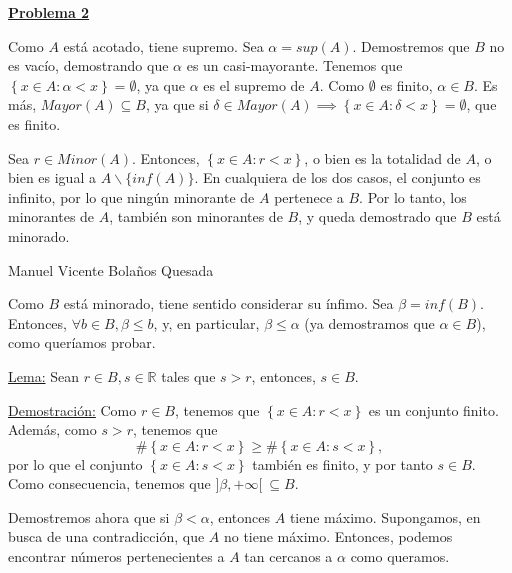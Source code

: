 \documentclass[10pt,a4paper]{article}
\begin{document}
	\begin{flushleft}
		\textbf{\underline{Problema 2}}
	\end{flushleft}
	
	Como $A$ está acotado, tiene supremo. Sea $\alpha = sup(A)$. Demostremos que $B$ no es vacío, demostrando que $\alpha$ es un casi-mayorante. Tenemos que $\left\lbrace x \in A : \alpha < x \right\rbrace  = \emptyset$, ya que $\alpha$ es el supremo de $A$. Como $\emptyset$ es finito, $\alpha \in B$. Es más, $Mayor(A) \subseteq B$, ya que si $\delta \in Mayor(A) \implies \left\lbrace x \in A : \delta < x \right\rbrace  = \emptyset$, que es finito. \newline
	
	Sea $r \in Minor(A)$. Entonces, $\left\lbrace x \in A : r < x \right\rbrace$, o bien es la totalidad de $A$, o bien es igual a $A \backslash \{inf(A)\}$. En cualquiera de los dos casos, el conjunto es infinito, por lo que ningún minorante de $A$ pertenece a $B$. Por lo tanto, los minorantes de $A$, también son minorantes de $B$, y queda demostrado que $B$ está minorado. \newpage
	
	\begin{flushleft}
		Manuel Vicente Bolaños Quesada	\newline 
	\end{flushleft}	
	

	
	Como $B$ está minorado, tiene sentido considerar su ínfimo. Sea $\beta = inf(B)$. Entonces, $\forall b \in B, \beta \leq b$, y, en particular, $\beta \leq \alpha$ (ya demostramos que $\alpha \in B$), como queríamos probar. \newline
	
	\underline{Lema:} Sean $r \in B, s \in \mathbb{R}$ tales que $s > r$, entonces, $s \in B$.
	
	\underline{Demostración:} Como $r \in B$, tenemos que $\left\lbrace x \in A : r < x \right\rbrace$ es un conjunto finito. Además, como $s > r$, tenemos que $$\#\left\lbrace x \in A : r < x \right\rbrace \geq \#\left\lbrace x \in A : s < x \right\rbrace ,$$ por lo que el conjunto $\left\lbrace x \in A : s < x \right\rbrace$ también es finito, y por tanto $s \in B$. Como consecuencia, tenemos que $] \beta, + \infty [ ~ \subseteq B$. \newline
	\newline
	
	Demostremos ahora que si $\beta < \alpha$, entonces $A$ tiene máximo. Supongamos, en busca de una contradicción, que $A$ no tiene máximo. Entonces, podemos encontrar números pertenecientes a $A$ tan cercanos a $\alpha$ como queramos. \newline
	
\end{document}
